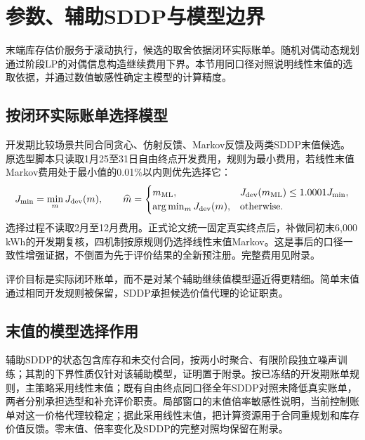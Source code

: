 \documentclass[UTF8,a4paper,zihao=-4,fontset=mac]{ctexart}
\begin{document}
\section{参数、辅助SDDP与模型边界}
末端库存估价服务于滚动执行，候选的取舍依据闭环实际账单。随机对偶动态规划通过阶段LP的对偶信息构造继续费用下界\cite{pereira,bhattacharya2018}。本节用同口径对照说明线性末值的选取依据，并通过数值敏感性确定主模型的计算精度。

\subsection{按闭环实际账单选择模型}
开发期比较场景共同合同贪心、仿射反馈、Markov反馈及两类SDDP末值候选。原选型脚本只读取1月25至31日自由终点开发费用，规则为最小费用，若线性末值Markov费用处于最小值的0.01\%以内则优先选择它：
\begin{equation}\label{eq:selection}
 J_{\min}=\min_mJ_{\rm dev}(m),\qquad
 \widehat m=\begin{cases}m_{\rm ML},&J_{\rm dev}(m_{\rm ML})\le1.0001J_{\min},\\
 \arg\min_mJ_{\rm dev}(m),&\text{otherwise}.
 \end{cases}
\end{equation}
选择过程不读取2月至12月费用。正式论文统一固定真实终点后，补做同初末6,000 kWh的开发期复核，四机制按原规则仍选择线性末值Markov。这是事后的口径一致性增强证据，不倒置为先于评价结果的全新预注册。完整费用见附录。

评价目标是实际闭环账单，而不是对某个辅助继续值模型逼近得更精细。简单末值通过相同开发规则被保留，SDDP承担候选价值代理的论证职责。

\subsection{末值的模型选择作用}
辅助SDDP的状态包含库存和未交付合同，按两小时聚合、有限阶段独立噪声训练；其割的下界性质仅针对该辅助模型，证明置于附录。按已冻结的开发期账单规则，主策略采用线性末值；既有自由终点同口径全年SDDP对照未降低真实账单，两者分别承担选型和补充评价职责。局部窗口的末值倍率敏感性说明，当前控制账单对这一价格代理较稳定；据此采用线性末值，把计算资源用于合同重规划和库存价值反馈。零末值、倍率变化及SDDP的完整对照均保留在附录。 
\end{document}
